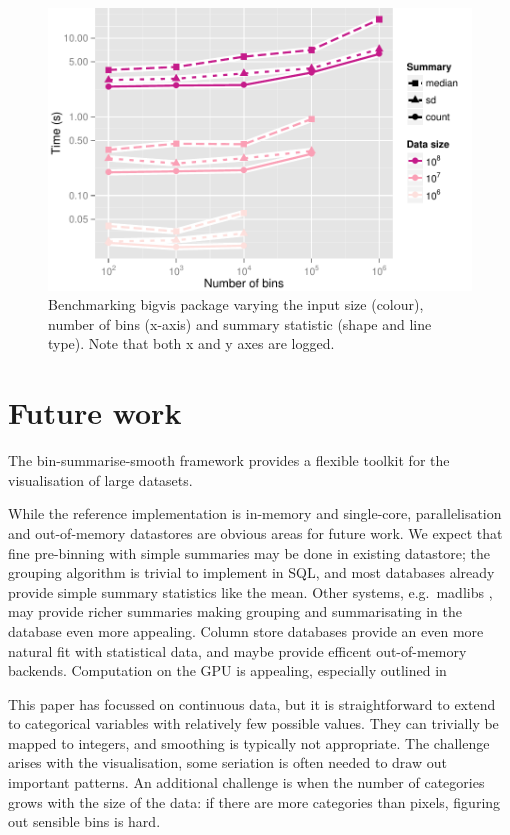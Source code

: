 \documentclass[journal]{vgtc}                %
\begin{document}
\begin{figure}
  \centering
   \includegraphics[width=\linewidth]{benchmark}
 \caption{Benchmarking bigvis package varying the input size (colour), number of bins (x-axis) and summary statistic (shape and line type). Note that both x and y axes are logged.}
 \label{fig:benchmark}
\end{figure}

\section{Future work}
\label{sec:conclusion}

The bin-summarise-smooth framework provides a flexible toolkit for the visualisation of large datasets. 

While the reference implementation is in-memory and single-core, parallelisation and out-of-memory datastores are obvious areas for future work. We expect that fine pre-binning with simple summaries may be done in existing datastore; the grouping algorithm is trivial to implement in SQL, and most databases already provide simple summary statistics like the mean. Other systems, e.g.\ madlibs \citep{hellerstein:2012}, may provide richer summaries making grouping and summarisating in the database even more appealing. Column store databases \citep{kersten:2011} provide an even more natural fit with statistical data, and maybe provide efficent out-of-memory backends. Computation on the GPU is appealing, especially outlined in \citep{liu:2013}

This paper has focussed on continuous data, but it is straightforward to extend to categorical variables with relatively few possible values. They can trivially be mapped to integers, and smoothing is typically not appropriate. The challenge arises with the visualisation, some seriation \citep{hahsler:2008} is often needed to draw out important patterns.  An additional challenge is when the number of categories grows with the size of the data: if there are more categories than pixels, figuring out sensible bins is hard.
\end{document}
